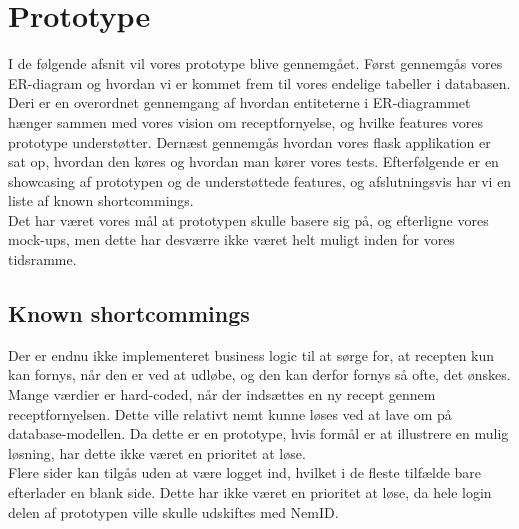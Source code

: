 \section{Prototype}
I de følgende afsnit vil vores prototype blive gennemgået. Først gennemgås vores ER-diagram og hvordan vi er kommet frem til vores endelige tabeller i databasen. Deri er en overordnet gennemgang af hvordan entiteterne i ER-diagrammet hænger sammen med vores vision om receptfornyelse, og hvilke features vores prototype understøtter. Dernæst gennemgås hvordan vores flask applikation er sat op, hvordan den køres og hvordan man kører vores tests. Efterfølgende er en showcasing af prototypen og de understøttede features, og afslutningsvis har vi en liste af known shortcommings.\\
Det har været vores mål at prototypen skulle basere sig på, og efterligne vores mock-ups, men dette har desværre ikke været helt muligt inden for vores tidsramme.






\newpage

\subsection{Known shortcommings}
Der er endnu ikke implementeret business logic til at sørge for, at recepten kun kan fornys, når den er ved at udløbe, og den kan derfor fornys så ofte, det ønskes.\\
Mange værdier er hard-coded, når der indsættes en ny recept gennem receptfornyelsen. Dette ville relativt nemt kunne løses ved at lave om på database-modellen. Da dette er en prototype, hvis formål er at illustrere en mulig løsning, har dette ikke været en prioritet at løse.\\
Flere sider kan tilgås uden at være logget ind, hvilket i de fleste tilfælde bare efterlader en blank side. Dette har ikke været en prioritet at løse, da hele login delen af prototypen ville skulle udskiftes med NemID.\\

